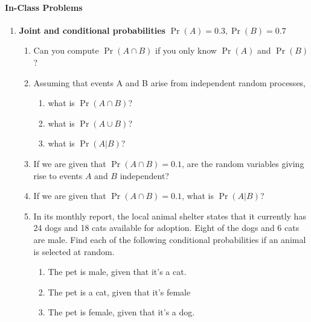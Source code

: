 \documentclass[10pt]{article}\usepackage[]{graphicx}\usepackage[]{color}
\begin{document}
\paragraph{In-Class Problems}

\begin{enumerate}
  \itemsep0.25in
\item \textbf{Joint and conditional probabilities} $\Pr(A) = 0.3, \Pr(B) = 0.7$
\begin{enumerate}
  \itemsep0.25in
\item Can you compute $\Pr(A \cap B)$ if you only know $\Pr(A)$ and $\Pr(B)$?
\item Assuming that events A and B arise from independent random processes,
\begin{enumerate}
\item what is $\Pr(A \cap B)$?
\item what is $\Pr(A \cup B)$?
\item what is $\Pr(A|B)$?
\end{enumerate}
\item If we are given that $\Pr(A \cap B) = 0.1$, are the random variables giving rise to events $A$ and $B$ independent?
\item If we are given that $\Pr(A \cap B) = 0.1$, what is $\Pr(A|B)$?
\item In its monthly report, the local animal shelter states that it currently has 24 dogs and 18 cats available for adoption. Eight of the dogs and 6 cats are male. Find each of the following conditional probabilities if an animal is selected at random.
  \begin{enumerate}
    \itemsep0.35in
    \item The pet is male, given that it's a cat.
    \item The pet is a cat, given that it's female
    \item The pet is female, given that it's a dog.
  \end{enumerate}
\end{enumerate}



\end{enumerate}
\end{document}
